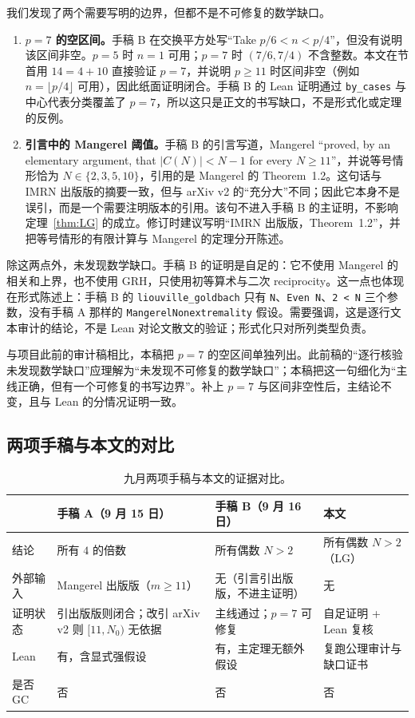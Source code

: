 \documentclass[11pt,a4paper]{ctexart}
\theoremstyle{plain}
\theoremstyle{definition}
\newcommand{\code}[1]{\texttt{#1}}
\begin{document}
我们发现了两个需要写明的边界，但都不是不可修复的数学缺口。
\begin{enumerate}
\item \textbf{$p=7$ 的空区间。}手稿 B 在交换平方处写“Take $p/6<n<p/4$”，但没有说明该区间非空。$p=5$ 时 $n=1$ 可用；$p=7$ 时 $(7/6,7/4)$ 不含整数。本文在节首用 $14=4+10$ 直接验证 $p=7$，并说明 $p\ge11$ 时区间非空（例如 $n=\lfloor p/4\rfloor$ 可用），因此纸面证明闭合。手稿 B 的 Lean 证明通过 \code{by\_cases} 与中心代表分类覆盖了 $p=7$，所以这只是正文的书写缺口，不是形式化或定理的反例。
\item \textbf{引言中的 Mangerel 阈值。}手稿 B 的引言写道，Mangerel “proved, by an elementary argument, that $|C(N)|<N-1$ for every $N\ge11$”，并说等号情形恰为 $N\in\{2,3,5,10\}$，引用的是 Mangerel 的 Theorem~1.2\cite{captain2026general}。这句话与 IMRN 出版版的摘要一致，但与 arXiv v2 的“充分大”不同；因此它本身不是误引，而是一个需要注明版本的引用。该句不进入手稿 B 的主证明，不影响定理~\ref{thm:LG} 的成立。修订时建议写明“IMRN 出版版，Theorem~1.2”，并把等号情形的有限计算与 Mangerel 的定理分开陈述。
\end{enumerate}

除这两点外，未发现数学缺口。手稿 B 的证明是自足的：它不使用 Mangerel 的相关和上界，也不使用 GRH，只使用初等算术与二次 reciprocity。这一点也体现在形式陈述上：手稿 B 的 \code{liouville\_goldbach} 只有 \code{N}、\code{Even N}、\code{2 < N} 三个参数，没有手稿 A 那样的 \code{MangerelNonextremality} 假设。需要强调，这是逐行文本审计的结论，不是 Lean 对论文散文的验证；形式化只对所列类型负责。

与项目此前的审计稿相比，本稿把 $p=7$ 的空区间单独列出。此前稿的“逐行核验未发现数学缺口”应理解为“未发现不可修复的数学缺口”；本稿把这一句细化为“主线正确，但有一个可修复的书写边界”。补上 $p=7$ 与区间非空性后，主结论不变，且与 Lean 的分情况证明一致。

\subsection{两项手稿与本文的对比}
\label{sec:audit-table}

\begin{table}[htbp]
\centering
\small
\caption{九月两项手稿与本文的证据对比。}
\label{tab:audit}
\setlength{\tabcolsep}{4pt}
\begin{tabular}{@{}p{2.3cm}p{4.1cm}p{4.4cm}p{3.3cm}@{}}
\toprule
 & 手稿 A（9 月 15 日） & 手稿 B（9 月 16 日） & 本文 \\
\midrule
结论 & 所有 $4$ 的倍数 & 所有偶数 $N>2$ & 所有偶数 $N>2$（LG） \\
外部输入 & Mangerel 出版版（$m\ge11$） & 无（引言引出版版，不进主证明） & 无 \\
证明状态 & 引出版版则闭合；改引 arXiv v2 则 $[11,N_0)$ 无依据 & 主线通过；$p=7$ 可修复 & 自足证明 + Lean 复核 \\
Lean & 有，含显式强假设 & 有，主定理无额外假设 & 复跑公理审计与缺口证书 \\
是否 GC & 否 & 否 & 否 \\
\bottomrule
\end{tabular}
\end{table}
\end{document}
